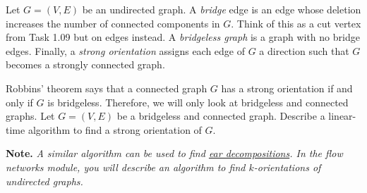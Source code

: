 \documentclass{article}
\begin{document}
\begin{question}
Let $G = (V, E)$ be an undirected graph. A {\em bridge} edge is an edge whose deletion increases the number of connected components in $G$. Think of this as a cut vertex from Task 1.09 but on edges instead. A {\em bridgeless graph} is a graph with no bridge edges. Finally, a {\em strong orientation} assigns each edge of $G$ a direction such that $G$ becomes a strongly connected graph.

Robbins' theorem says that a connected graph $G$ has a strong orientation if and only if $G$ is bridgeless. Therefore, we will only look at bridgeless and connected graphs. Let $G = (V, E)$ be a bridgeless and connected graph. Describe a linear-time algorithm to find a strong orientation of $G$.

{\bfseries Note.} {\em A similar algorithm can be used to find \href{https://en.wikipedia.org/wiki/Ear_decomposition}{ear decompositions}. In the flow networks module, you will describe an algorithm to find $k$-orientations of undirected graphs.}
\end{question}
\end{document}
